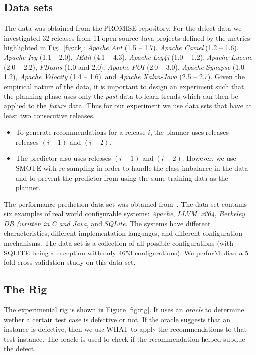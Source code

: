 \documentclass[conference]{IEEEtran}
\newcommand{\kw}[1]{\textit{#1}}
\begin{document}
\subsection{Data sets}
The data was obtained from the PROMISE repository. For the defect data we investigated 32 releases from 11 open source Java projects defined by the metrics highlighted in Fig.~\ref{fig:ck}: \kw{Apache Ant} (1.5 -- 1.7), \kw{Apache Camel} (1.2 -- 1.6), \kw{Apache Ivy} (1.1 -- 2.0), \kw{JEdit} (4.1 -- 4.3), \kw{Apache Log4j} (1.0 -- 1.2), \kw{Apache Lucene} (2.0 -- 2.2), \kw{PBeans} (1.0 and 2.0), \kw{Apache POI} (2.0 -- 3.0), \kw{Apache Synapse} (1.0 -- 1.2), \kw{Apache Velocity} (1.4 -- 1.6), and \kw{Apache Xalan-Java} (2.5 -- 2.7). Given the empirical nature of the data, it is important to design an experiment such that the planning phase uses only the \kw{past} data to learn trends which can then be applied to the \kw{future} data. Thus for our experiment we use data sets that have at least two consecutive releases. 
\begin{itemize}
\item To generate recommendations for a release $i$, the planner uses releases releases $(i-1)$ and $(i-2)$.
\item The predictor also uses releases $(i-1)$ and $(i-2)$. However, we use SMOTE with re-sampling in order to handle the class imbalance in the data and to prevent the predictor from using the same training data as the planner.
\end{itemize}


The performance prediction data set was obtained from~\cite{}. The data set contains six examples of real world configurable systems: \kw{Apache}, \kw{LLVM}, \kw{x264}, \kw{Berkeley DB (written in C and Java}, and \kw{SQLite}. The systems have different characteristics, different implementation languages, and different configuration mechanisms. The data set is a collection of all possible configurations (with SQLITE being a exception with only 4653 configurations). We perforMedian a 5-fold cross validation study on this data set.

\subsection{The Rig}

The experimental rig is shown in Figure \ref{fig:rig}. It uses an \textit{oracle} to determine wether a certain test case is defective or not. If the oracle suggests that an instance is defective, then we use WHAT to apply the recommendations to that test instance. The oracle is used to check if the recommendation helped subdue the defect.
\end{document}
